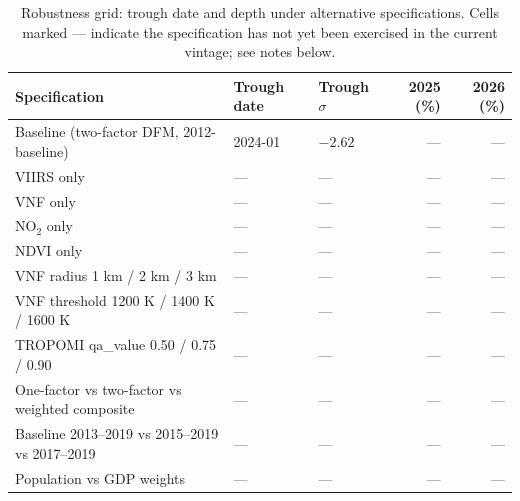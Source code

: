 \begin{table}[H]
\centering\scriptsize
\caption{Robustness grid: trough date and depth under alternative specifications. Cells marked --- indicate the specification has not yet been exercised in the current vintage; see notes below.}
\label{tab:robustness}
\begin{tabular}{lllrr}
\toprule
Specification & Trough date & Trough $\sigma$ & 2025 (\%) & 2026 (\%) \\
\midrule
Baseline (two-factor DFM, 2012-baseline) & 2024-01 & $-2.62$ & --- & --- \\
VIIRS only & --- & --- & --- & --- \\
VNF only & --- & --- & --- & --- \\
NO$_2$ only & --- & --- & --- & --- \\
NDVI only & --- & --- & --- & --- \\
VNF radius 1 km / 2 km / 3 km & --- & --- & --- & --- \\
VNF threshold 1200 K / 1400 K / 1600 K & --- & --- & --- & --- \\
TROPOMI qa\_value 0.50 / 0.75 / 0.90 & --- & --- & --- & --- \\
One-factor vs two-factor vs weighted composite & --- & --- & --- & --- \\
Baseline 2013--2019 vs 2015--2019 vs 2017--2019 & --- & --- & --- & --- \\
Population vs GDP weights & --- & --- & --- & --- \\
\bottomrule
\end{tabular}
\end{table}